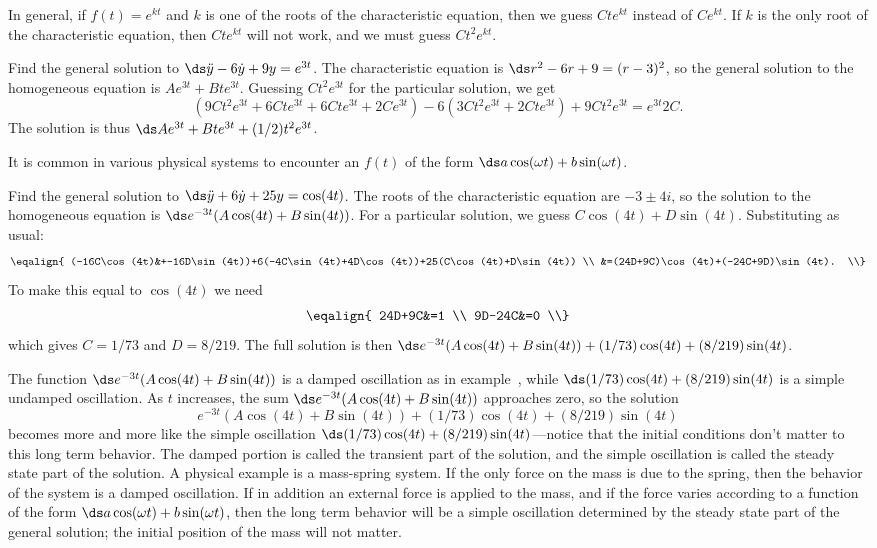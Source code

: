 In general, if $f(t)=e^{kt}$ and $k$ is one of the roots of the
characteristic equation, then we guess $Cte^{kt}$ instead of
$Ce^{kt}$. If $k$ is the only root of the characteristic equation,
then $Cte^{kt}$ will not work, and we must guess $Ct^2e^{kt}$.

\begin{example} Find the general solution to $\ds\ddot y-6\dot
y+9y=e^{3t}$. The characteristic equation is 
$\ds r^2-6r+9=(r-3)^2$, so the general solution to the homogeneous
equation is $Ae^{3t}+Bte^{3t}$. Guessing $Ct^2e^{3t}$ for the
particular solution, we get
$$
(9Ct^2e^{3t}+6Cte^{3t}+6Cte^{3t}+2Ce^{3t})-6(3Ct^2e^{3t}+2Cte^{3t})+9Ct^2e^{3t}
=e^{3t}2C.
$$
The solution is thus $\ds Ae^{3t}+Bte^{3t}+(1/2)t^2e^{3t}$.
\end{example}

It is common in various physical systems to encounter an $f(t)$ of the
form $\ds a\cos(\omega t)+b\sin(\omega t)$.

\begin{example} Find the general solution to $\ds\ddot y+6\dot
y+25y=\cos(4t)$. The roots of the characteristic equation are
$-3\pm 4i$, so the solution to the homogeneous equation is
$\ds e^{-3t}(A\cos(4t)+B\sin(4t))$. For a particular solution, we
guess $C\cos(4t)+D\sin(4t)$. Substituting as usual:
$$\eqalign{
(-16C\cos(4t)&+-16D\sin(4t))+6(-4C\sin(4t)+4D\cos(4t))+25(C\cos(4t)+D\sin(4t)) \\
&=(24D+9C)\cos(4t)+(-24C+9D)\sin(4t). \\}
$$
To make this equal to $\cos(4t)$ we need
$$\eqalign{
24D+9C&=1 \\
9D-24C&=0 \\}
$$
which gives $C=1/73$ and $D=8/219$. The full solution is then
$\ds e^{-3t}(A\cos(4t)+B\sin(4t))+(1/73)\cos(4t)+(8/219)\sin(4t)$.

The function $\ds e^{-3t}(A\cos(4t)+B\sin(4t))$ is a damped
oscillation as in example~,
while $\ds(1/73)\cos(4t)+(8/219)\sin(4t)$ is a simple undamped
oscillation. As $t$ increases, the sum $\ds
e^{-3t}(A\cos(4t)+B\sin(4t))$ approaches zero, so the solution
$$e^{-3t}(A\cos(4t)+B\sin(4t))+(1/73)\cos(4t)+(8/219)\sin(4t)$$
becomes more and more like the simple oscillation
$\ds(1/73)\cos(4t)+(8/219)\sin(4t)$---notice that the initial
conditions don't matter to this long term behavior. The damped portion
is called the 
{\dfont transient\/} part of the
solution, and the simple oscillation is called the {\dfont
  steady state\/} 
part of the solution. 
A physical example is a mass-spring system. If the only force on the
mass is due to the spring, then the behavior of the system is a damped
oscillation. If in addition an external force is applied to the mass,
and if the force varies according to a function of the form
 $\ds a\cos(\omega t)+b\sin(\omega t)$, then the long term behavior
will be a simple oscillation determined by the steady state part of the
general solution; the initial position of the mass will not matter.
\end{example}

